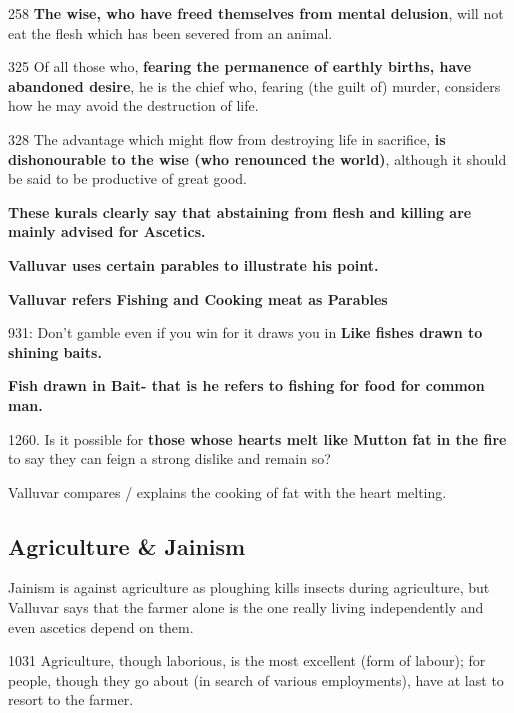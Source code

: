 258 \textbf{The wise, who have freed themselves from mental delusion}, will not eat the flesh which has been severed from an animal.

 325 Of all those who, \textbf{fearing the permanence of earthly births, have abandoned desire}, he is the chief who, fearing (the guilt of) murder, considers how he may avoid the destruction of life.

328 The advantage which might flow from destroying life in sacrifice, \textbf{is dishonourable to the wise (who renounced the world)}, although it should be said to be productive of great good.

\textbf{These kurals clearly say that abstaining from flesh and killing are mainly advised for Ascetics.}

\textbf{Valluvar uses certain parables to illustrate his point.}

\textbf{Valluvar refers Fishing and Cooking meat as Parables}

931: Don’t gamble even if you win for it draws you in \textbf{Like fishes drawn to shining baits.}

\textbf{Fish drawn in Bait- that is he refers to fishing for food for common man.}

\newpage

1260. Is it possible for \textbf{those whose hearts melt like Mutton fat in the fire} to say they can feign a strong dislike and remain so?

Valluvar compares / explains the cooking of fat with the heart melting.


\subsection*{Agriculture \& Jainism}

Jainism is against agriculture as ploughing kills insects during agriculture, but Valluvar says that the farmer alone is the one really living independently and even ascetics depend on them.

1031 Agriculture, though laborious, is the most excellent (form of labour); for people, though they go about (in search of various employments), have at last to resort to the farmer.


